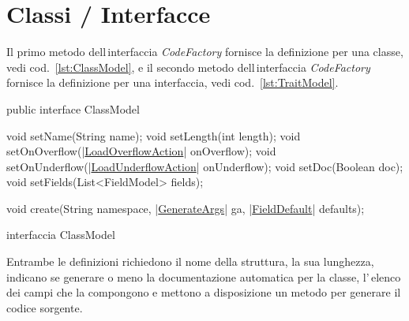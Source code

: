 \documentclass[a4paper,10pt]{report}
\newif\ifesource
\newenvironment{elisting}[1][!htb]
  {\captionsetup{aboveskip=0pt}\begin{listing}[#1]}
  {\end{listing}%
}
\begin{document}
\section{Classi / Interfacce}
Il primo metodo dell\,interfaccia \textsl{CodeFactory} fornisce la definizione 
per una classe, vedi cod.~\ref{lst:ClassModel}, e il secondo metodo 
dell\,interfaccia \textsl{CodeFactory} fornisce la definizione per una 
interfaccia, vedi cod.~\ref{lst:TraitModel}.


\ifesource
\begin{figure*}[!htb]
\begin{lstlisting}[language=java, caption=interfaccia ClassModel, 
label=lst:ClassModel]
public interface ClassModel {
    void setName(String name);
    void setLength(int length);
    void setOnOverflow((*\hyperref[lst:LoadOverflowAction]{LoadOverflowAction}*) onOverflow);
    void setOnUnderflow((*\hyperref[lst:LoadUnderflowAction]{LoadUnderflowAction}*) onUnderflow);
    void setDoc(Boolean doc);
    void setFields(List<FieldModel> fields);

    void create(String namespace, (*\hyperref[lst:GenerateArgs]{GenerateArgs}*) ga, (*\hyperref[lst:FieldDefault]{FieldDefault}*) defaults);
}
\end{lstlisting}\index{ClassModel}
\end{figure*}
\else
\begin{elisting}
\begin{javacode}
public interface ClassModel {
    void setName(String name);
    void setLength(int length);
    void setOnOverflow(|\hyperref[lst:LoadOverflowAction]{LoadOverflowAction}| onOverflow);
    void setOnUnderflow(|\hyperref[lst:LoadUnderflowAction]{LoadUnderflowAction}| onUnderflow);
    void setDoc(Boolean doc);
    void setFields(List<FieldModel> fields);

    void create(String namespace, |\hyperref[lst:GenerateArgs]{GenerateArgs}| ga, |\hyperref[lst:FieldDefault]{FieldDefault}| defaults);
}
\end{javacode}
\caption{interfaccia ClassModel}
\label{lst:ClassModel}
\end{elisting}
\fi

Entrambe le definizioni richiedono il nome della struttura, la sua
lunghezza, indicano se generare o meno la documentazione automatica per la 
classe, l'\,elenco dei campi che la compongono e mettono a disposizione un 
metodo per generare il codice sorgente.
\end{document}
